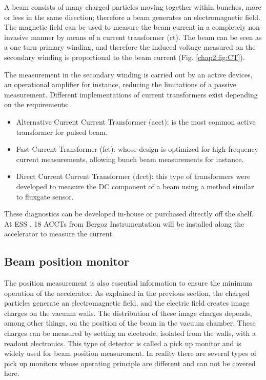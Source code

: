 \begin{refsection}
  A beam consists of many charged particles moving together within bunches, more or less in the same direction; therefore a beam generates an electromagnetic field. The magnetic field can be used to measure the beam current in a completely non-invasive manner by means of a current transformer (\acrshort{ct}). The beam can be seen as a one turn primary winding, and therefore the induced voltage measured on the secondary winding is proportional to the beam current (Fig. \ref{chap2:fig:CT}). 
  
  The measurement in the secondary winding is carried out by an active devices, an operational amplifier for instance, reducing the limitations of a passive measurement. Different implementations of current transformers exist depending on the requirements:
  \begin{itemize}
    \item Alternative Current Current Transformer (\acrshort{acct}): is the most common active transformer for pulsed beam.
    \item Fast Current Transformer (\acrshort{fct}): whose design is optimized for high-frequency current measurements, allowing bunch beam measurements for instance.
    \item Direct Current Current Transformer (\acrshort{dcct}): this type of transformers were developed to measure the DC component \cite{Unser1969} of a beam using a method similar to fluxgate sensor.
  \end{itemize}

  These diagnostics can be developed in-house or purchased directly off the shelf. At ESS \cite{Hassanzadegan:IPAC2018-WEPAF088}, 18 ACCTs from Bergoz Instrumentation \cite{bergoz2019} will be installed along the accelerator to measure the current. %

  \subsection{Beam position monitor}
  The position measurement is also essential information to ensure the minimum operation of the accelerator. As explained in the previous section, the charged particles generate an electromagnetic field, and the electric field creates image charges on the vacuum walls. The distribution of these image charges depends, among other things, on the position of the beam in the vacuum chamber. These charges can be measured by setting an electrode, isolated from the walls, with a readout electronics. This type of detector is called a pick up monitor and is widely used for beam position measurement. In reality there are several types of pick up monitors whose operating principle are different and can not be covered here.


\end{refsection}
